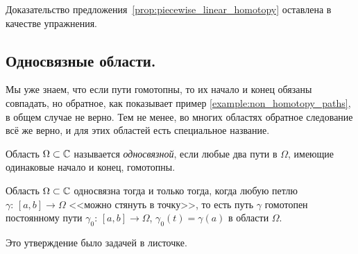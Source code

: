\documentclass[../complex-analysis.tex]{subfiles}
\begin{document}
Доказательство предложения~\ref{prop:piecewise_linear_homotopy} оставлена в качестве упражнения.

\subsection{Односвязные области.}

Мы уже знаем, что если пути гомотопны, то их начало и конец обязаны совпадать, но обратное, как показывает пример \ref{example:non_homotopy_paths}, в общем случае не верно. Тем не менее, во многих областях обратное следование всё же верно, и для этих областей есть специальное название.

\begin{df}
 Область $ \Omega \subset\mathbb{C} $ называется \emph{односвязной}, если любые два пути в $ \Omega $, имеющие одинаковые начало и конец, гомотопны.
\end{df}

\begin{claim}
 Область $ \Omega \subset \mathbb{C} $ односвязна тогда и только тогда, когда любую петлю $ \gamma \colon\,[a,b] \to \Omega $ <<можно стянуть в точку>>, то есть путь $ \gamma $ гомотопен постоянному пути $ \gamma_0 \colon\,[a,b] \to \Omega $, $ \gamma_0(t) = \gamma(a) $ в области $ \Omega $.
\end{claim}

Это утверждение было задачей в листочке.
\end{document}
